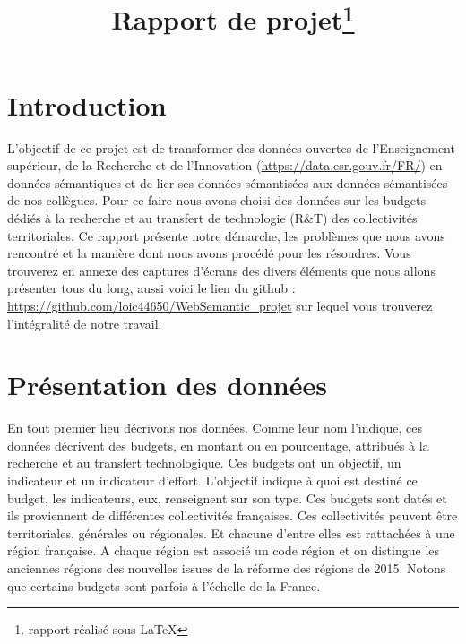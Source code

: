 \documentclass[a4paper,sffamily,12pt]{article}
\title{\vspace{\fill}\LARGE\bfseries\sffamily Rapport de projet\protect\footnote{rapport réalisé sous \LaTeX} \vspace{\fill}}
\begin{document}
	\date{} %
	\maketitle %

	\thispagestyle{fancy} %
	
	\newpage
			
	\renewcommand{\contentsname}{Sommaire}
	\tableofcontents
	
	\newpage
	
	\section{Introduction}

		\vspace{0.5cm}

		L’objectif de ce projet est de transformer des données ouvertes de l'Enseignement supérieur, de la Recherche et de l'Innovation (\url{https://data.esr.gouv.fr/FR/}) en données sémantiques et de lier ses données sémantisées aux données sémantisées de nos collègues. Pour ce faire nous avons choisi des données sur les budgets dédiés à la recherche et au transfert de technologie (R\&T) des collectivités territoriales. Ce rapport présente notre démarche, les problèmes que nous avons rencontré et la manière dont nous avons procédé pour les résoudres. Vous trouverez en annexe des captures d'écrans des divers éléments que nous allons présenter tous du long, aussi voici le lien du github : \url{https://github.com/loic44650/WebSemantic_projet} sur lequel vous trouverez l'intégralité de notre travail. \\

		\vspace{0.5cm}
		
	\section{Présentation des données}				

		\vspace{0.5cm}
		
		En tout premier lieu décrivons nos données. Comme leur nom l'indique, ces données décrivent des budgets, en montant ou en pourcentage, attribués à la recherche et au transfert technologique. Ces budgets ont un objectif, un indicateur et un indicateur d'effort. L'objectif indique à quoi est destiné ce budget, les indicateurs, eux, renseignent sur son type. Ces budgets sont datés et ils proviennent de différentes collectivités françaises. Ces collectivités peuvent être territoriales, générales ou régionales. Et chacune d'entre elles est rattachées à une région française. A chaque région est associé un code région et on distingue les anciennes régions des nouvelles issues de la réforme des régions de 2015. Notons que certains budgets sont parfois à l’échelle de la France. 
				
\end{document}
